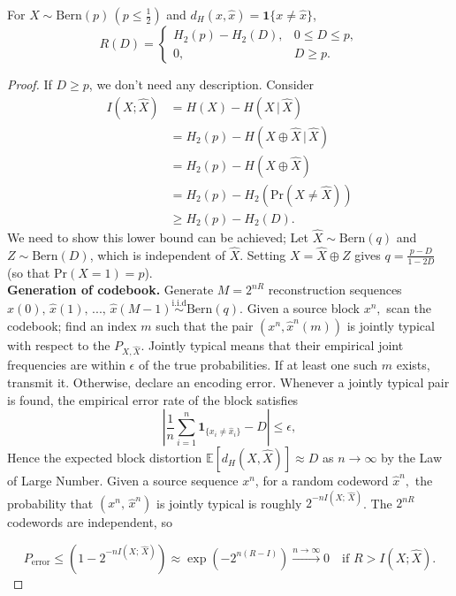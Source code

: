 \begin{example}

For \(X\sim\mathrm{Bern}(p)\,(p\leq \frac12)\) and
\(d_H(x,\widehat x)=\mathbf1\{x\ne\widehat x\}\), 
\[
R(D)=\begin{cases}
H_2(p)-H_2(D), & 0\le D\le p,\\[2pt]
0,             & D\ge p.
\end{cases}
\]

\begin{proof}
If $D\geq p$, we don't need any description. Consider 
\[\begin{aligned}I(X;\widehat{X}) &= H(X)-H(X\,|\,\widehat{X})\\&=H_2(p)-H(X\oplus\widehat{X}\,|\,\widehat{X})\\&=H_2(p)-H(X\oplus\widehat{X})\\&=H_2(p)-H_2(\text{Pr}(X\neq \widehat{X}))\\&\geq H_2(p)-H_2(D).\end{aligned}\]
We need to show this lower bound can be achieved; Let $\widehat{X} \sim \mathrm{Bern}(q)$ and $Z\sim \mathrm{Bern}(D)$, which is independent of $\widehat{X}$. Setting $X=\widehat{X}\oplus Z$ gives $q=\frac{p-D}{1-2D}$ (so that $\text{Pr}(X=1)=p$).\\
\textbf{Generation of codebook.} Generate $M=2^{nR}$ reconstruction sequences $\widehat{x}(0),\,\widehat{x}(1),\,...,\,\widehat{x}(M-1) \overset{\text{i.i.d}}{\sim} \mathrm{Bern}(q)$. Given a source block $x^n,$ scan the codebook; find an index $m$ such that the pair $(x^n,\widehat{x}^n(m))$ is jointly typical with respect to the $P_{X,\widehat{X}}$. Jointly typical means that their empirical joint frequencies are within $\epsilon$ of the true probabilities. If at least one such $m$ exists, transmit it. Otherwise, declare an encoding error. Whenever a jointly typical pair is found, the empirical error rate of the block satisfies 
$$
\left|\frac{1}{n}\sum_{i=1}^n\mathbf{1}_{\{x_i\neq\widehat{x}_i\}}-D\right|\leq\epsilon,
$$
Hence the expected block distortion $\mathbb{E}[d_H(X,\widehat{X})]\approx D$ as $n\to\infty$ by the Law of Large Number. Given a source sequence $x^n$, for a random codeword $\widehat{x}^n,$ the probability that $(x^n,\,\widehat{x}^n)$ is jointly typical is roughly $2^{-nI(X;\,\widehat{X})}$. The $2^{nR}$ codewords are independent, so

$$P_\text{error}\leq(1-2^{-nI(X;\,\widehat{X})})\approx \exp(-2^{n(R-I)})\overset{n\to\infty}{\longrightarrow}0\quad\text{if}\,\,R>I(X;\widehat{X}).$$

\end{proof}
\end{example}

